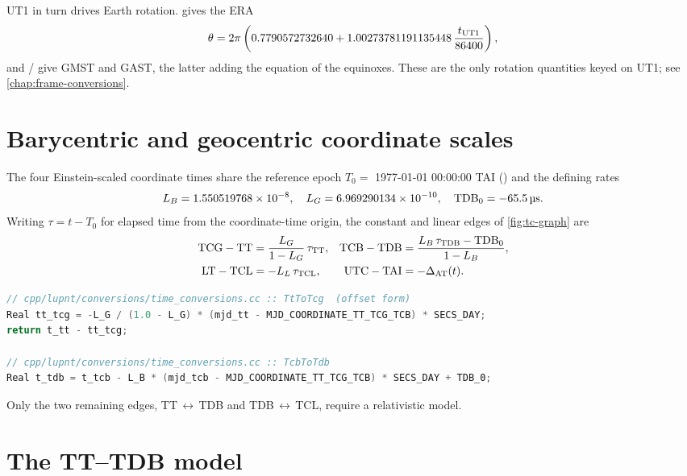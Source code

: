 UT1 in turn drives Earth rotation.  gives the ERA
%
\begin{equation}
\label{eq:tc-era}
  \theta = 2\pi\left(0.7790572732640
           + 1.00273781191135448\,\frac{t_{\mathrm{UT1}}}{86400}\right),
\end{equation}
%
and  /  give
GMST and GAST, the latter adding the equation of the equinoxes. These are the
only rotation quantities keyed on UT1; see \cref{chap:frame-conversions}.

\section{Barycentric and geocentric coordinate scales}
\label{sec:tc-bary}

The four Einstein-scaled coordinate times share the reference epoch
$T_0 = $ 1977-01-01 00:00:00 TAI () and the
defining rates \citep{iers2010}
%
\begin{equation}
\label{eq:tc-rates}
  L_B = 1.550519768\times10^{-8},\quad
  L_G = 6.969290134\times10^{-10},\quad
  \mathrm{TDB}_0 = \SI{-65.5}{\micro\second} .
\end{equation}
%
Writing $\tau = t - T_0$ for elapsed time from the coordinate-time origin, the
constant and linear edges of \cref{fig:tc-graph} are
%
\begin{align}
  \label{eq:tc-linear}
  \mathrm{TCG} - \mathrm{TT}   &= \frac{L_G}{1 - L_G}\,\tau_{\mathrm{TT}}, &
  \mathrm{TCB} - \mathrm{TDB}  &= \frac{L_B\,\tau_{\mathrm{TDB}} - \mathrm{TDB}_0}{1 - L_B}, \\
  \mathrm{LT} - \mathrm{TCL}   &= -L_L\,\tau_{\mathrm{TCL}}, &
  \mathrm{UTC} - \mathrm{TAI}  &= -\Delta_{\mathrm{AT}}(t) .
\end{align}

\begin{lstlisting}[language=cpp]
// cpp/lupnt/conversions/time_conversions.cc :: TtToTcg  (offset form)
Real tt_tcg = -L_G / (1.0 - L_G) * (mjd_tt - MJD_COORDINATE_TT_TCG_TCB) * SECS_DAY;
return t_tt - tt_tcg;

// cpp/lupnt/conversions/time_conversions.cc :: TcbToTdb
Real t_tdb = t_tcb - L_B * (mjd_tcb - MJD_COORDINATE_TT_TCG_TCB) * SECS_DAY + TDB_0;
\end{lstlisting}

Only the two remaining edges, TT\,$\leftrightarrow$\,TDB and
TDB\,$\leftrightarrow$\,TCL, require a relativistic model.

\section{The TT--TDB model}
\label{sec:tc-tttdb}


